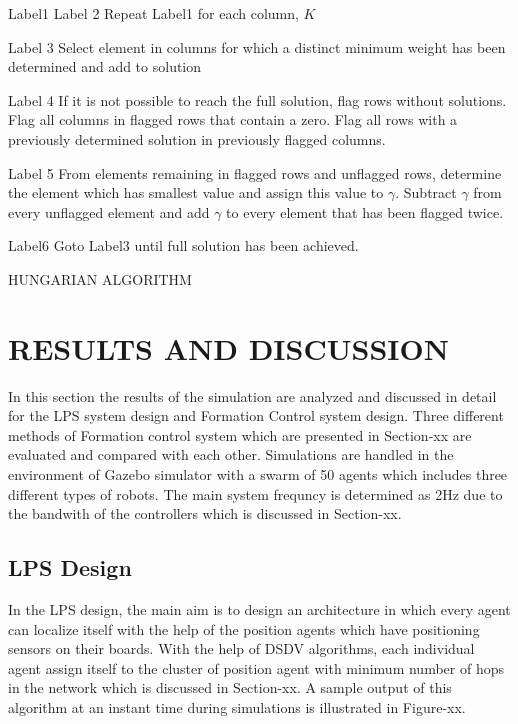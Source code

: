 \documentclass[twoside]{article}
\begin{document}
	\begin{algorithm}[H]
	
	     Label1  \;
	   Label 2  \; 
	   {Repeat Label1 for each column, $K$}
   
      Label 3  \; 
      Select element in columns for which a distinct minimum weight has been determined and add to solution
     
     Label 4 \;
     If it is not possible to reach the full solution, flag rows without solutions. Flag all columns in flagged rows that contain a zero. Flag all rows with a previously determined solution in previously flagged columns.
     
     Label 5 \;
     From elements remaining in flagged rows and unflagged rows, determine the element which has smallest value and assign this value to $\gamma$. Subtract $\gamma$  from every unflagged element and add  $\gamma$ to every element that has been flagged twice.
     
     Label6 \;
     Goto Label3 until full solution has been achieved.
     
     		\caption{HUNGARIAN ALGORITHM}
		\end{algorithm}
	

\section{RESULTS AND DISCUSSION}	
	
	In this section the results of the simulation are analyzed and discussed in detail for the LPS system design and Formation Control system design. Three different methods of Formation control system which are presented in Section-xx are evaluated and compared with each other. Simulations are handled in the environment of Gazebo simulator with a swarm of 50 agents which includes three different types of robots. The main system frequncy is determined as 2Hz due to the bandwith of the controllers which is discussed in Section-xx. 
	
	\subsection{LPS  Design}
In the LPS design, the main aim is to design an architecture in which every agent can localize itself with the help of the position agents which have positioning sensors on their boards. With the help of DSDV algorithms, each individual agent assign itself to the cluster of position agent with minimum number of hops in the network which is discussed in Section-xx. A sample output of this algorithm at an instant time during simulations is illustrated in Figure-xx. 
	
\end{document}
